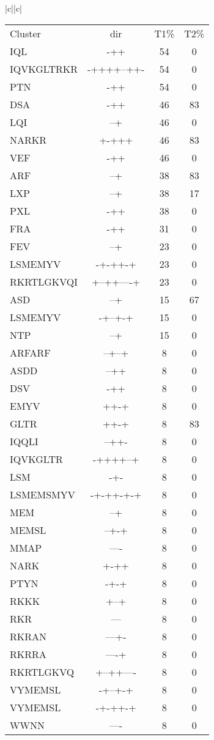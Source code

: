 \documentclass[table,
12pt, %
a4paper, %
oneside, %
headinclude,footinclude, %
BCOR5mm, %
]{scrartcl}
\begin{document}
\begin{table}[htbp]
\begin{adjustbox}{center}
\begin{tabular}{|c||c|}
\begin{tabular}{l ccc}
Cluster&dir& T1\%&T2\%\\
IQL&-++&54&0\\
IQVKGLTRKR&-++++--++-&54&0\\
PTN&-++&54&0\\
DSA&-++&46&83\\
LQI&--+&46&0\\
NARKR&+-+++&46&83\\
VEF&-++&46&0\\
ARF&--+&38&83\\
LXP&--+&38&17\\
PXL&-++&38&0\\
FRA&-++&31&0\\
FEV&--+&23&0\\
LSMEMYV&-+-++-+&23&0\\
RKRTLGKVQI&+--++----+&23&0\\
ASD&--+&15&67\\
LSMEMYV&-+--+-+&15&0\\
NTP&--+&15&0\\
ARFARF&--+--+&8&0\\
ASDD&--++&8&0\\
DSV&-++&8&0\\
EMYV&++-+&8&0\\
GLTR&++-+&8&83\\
IQQLI&--++-&8&0\\
IQVKGLTR&-++++--+&8&0\\
LSM&-+-&8&0\\
LSMEMSMYV&-+-++-+-+&8&0\\
MEM&--+&8&0\\
MEMSL&--+-+&8&0\\
MMAP&----&8&0\\
NARK&+-++&8&0\\
PTYN&-+-+&8&0\\
RKKK&+--+&8&0\\
RKR&---&8&0\\
RKRAN&---+-&8&0\\
RKRRA&----+&8&0\\
RKRTLGKVQ&+--++----&8&0\\
VYMEMSL&-+--+-+&8&0\\
VYMEMSL&-+-++-+&8&0\\
WWNN&----&8&0\\
\end{tabular} \\ \hline
\end{tabular}
\end{adjustbox}
\end{table}
\end{document}
